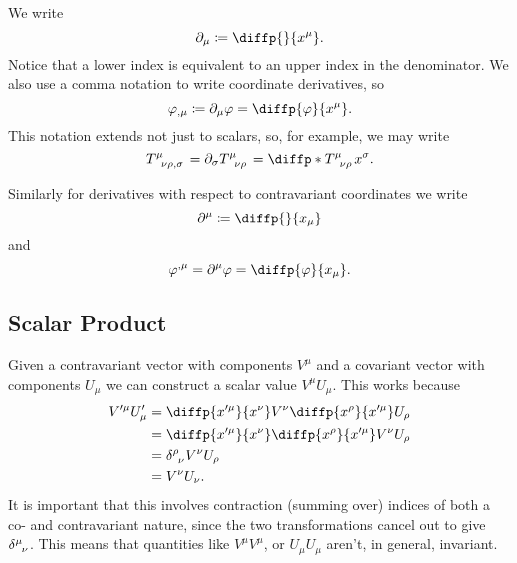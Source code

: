 \documentclass[fleqn]{NotesClass}
\begin{document}
    \begin{ntn}{}{}
        We write
        \begin{equation}
            \partial_\mu \coloneqq \diffp{}{x^\mu}.
        \end{equation}
        Notice that a lower index is equivalent to an upper index in the denominator.
        We also use a comma notation to write coordinate derivatives, so
        \begin{equation}
            \varphi_{,\mu} \coloneqq \partial_\mu \varphi = \diffp{\varphi}{x^\mu}.
        \end{equation}
        This notation extends not just to scalars, so, for example, we may write
        \begin{equation}
            \tensor{T}{^\mu_{\nu\rho,\sigma}} = \partial_\sigma \tensor{T}{^\mu_{\nu\rho}} = \diffp*{\tensor{T}{^\mu_{\nu\rho}}}{x^\sigma}.
        \end{equation}
        
        Similarly for derivatives with respect to contravariant coordinates we write
        \begin{equation}
            \partial^\mu \coloneqq \diffp{}{x_\mu}
        \end{equation}
        and
        \begin{equation}
            \varphi^{,\mu} = \partial^\mu \varphi = \diffp{\varphi}{x_\mu}.
        \end{equation}
    \end{ntn}
    
    \subsection{Scalar Product}
    Given a contravariant vector with components \(V^\mu\) and a covariant vector with components \(U_\mu\) we can construct a scalar value \(V^\mu U_\mu\).
    This works because
    \begin{align}
        V'^\mu U'_\mu &= \diffp{x'^\mu}{x^\nu} V^\nu \diffp{x^\rho}{x'^\mu} U_\rho\\
        &= \diffp{x'^\mu}{x^\nu} \diffp{x^\rho}{x'^\mu} V^\nu U_\rho\\
        &= \tensor{\delta}{^\rho_\nu} V^\nu U_\rho\\
        &= V^\nu U_\nu.
    \end{align}
    It is important that this involves contraction (summing over) indices of both a co- and contravariant nature, since the two transformations cancel out to give \(\tensor{\delta}{^\mu_\nu}\).
    This means that quantities like \(V^\mu V^\mu\), or \(U_\mu U_\mu\) aren't, in general, invariant.
    
\end{document}

